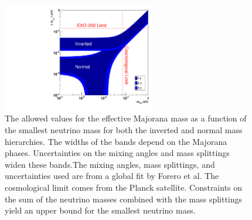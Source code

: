 \documentclass[herrin-thesis.tex]{subfiles}
\begin{document}
\begin{figure}
	\centering
	\includegraphics[width=0.6\textwidth]{./plots/nu_meff_v_mmin.pdf}
	\caption[Effective Majorana mass vs. smallest neutrino mass]{The allowed values for the effective Majorana mass as a function of the smallest neutrino mass for both the inverted and normal mass hierarchies. The widths of the bands depend on the Majorana phases. Uncertainties on the mixing angles and mass splittings widen these bands.The mixing angles, mass splittings, and uncertainties used are from a global fit by Forero et al.\cite{Forero:2012cr} The cosmological limit comes from the Planck satellite. Constraints on the sum of the neutrino masses combined with the mass splittings yield an upper bound for the smallest neutrino mass.}
	\label{fig:nu_meff_v_mmin}
\end{figure}\addref
\end{document}

